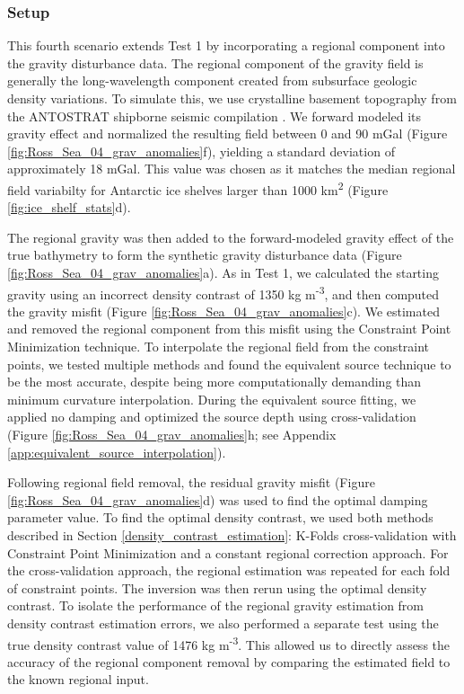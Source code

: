 \documentclass[tc, manuscript]{copernicus}
\begin{document}
\subsubsection{Setup}
This fourth scenario extends Test 1 by incorporating a regional component into the gravity disturbance data. The regional component of the gravity field is generally the long-wavelength component created from subsurface geologic density variations.  To simulate this, we use crystalline basement topography from the ANTOSTRAT shipborne seismic compilation \citep[Figure \ref{fig:model}e;][]{brancolinidescriptive1995}. We forward modeled its gravity effect and normalized the resulting field between 0 and 90 mGal (Figure \ref{fig:Ross_Sea_04_grav_anomalies}f), yielding a standard deviation of approximately 18 mGal. This value was chosen as it matches the median regional field variabilty for Antarctic ice shelves larger than 1000 km\textsuperscript{2} (Figure \ref{fig:ice_shelf_stats}d).

The regional gravity was then added to the forward-modeled gravity effect of the true bathymetry to form the synthetic gravity disturbance data (Figure \ref{fig:Ross_Sea_04_grav_anomalies}a). As in Test 1, we calculated the starting gravity using an incorrect density contrast of 1350 kg m\textsuperscript{-3}, and then computed the gravity misfit (Figure \ref{fig:Ross_Sea_04_grav_anomalies}c). We estimated and removed the regional component from this misfit using the Constraint Point Minimization technique. To interpolate the regional field from the constraint points, we tested multiple methods and found the equivalent source technique to be the most accurate, despite being more computationally demanding than minimum curvature interpolation. During the equivalent source fitting, we applied no damping and optimized the source depth using cross-validation (Figure \ref{fig:Ross_Sea_04_grav_anomalies}h; see Appendix \ref{app:equivalent_source_interpolation}).

Following regional field removal, the residual gravity misfit (Figure \ref{fig:Ross_Sea_04_grav_anomalies}d) was used to find the optimal damping parameter value. To find the optimal density contrast, we used both methods described in Section \ref{density_contrast_estimation}: K-Folds cross-validation with Constraint Point Minimization and a constant regional correction approach. For the cross-validation approach, the regional estimation was repeated for each fold of constraint points. The inversion was then rerun using the optimal density contrast. To isolate the performance of the regional gravity estimation from density contrast estimation errors, we also performed a separate test using the true density contrast value of 1476 kg m\textsuperscript{-3}. This allowed us to directly assess the accuracy of the regional component removal by comparing the estimated field to the known regional input.
\end{document}
